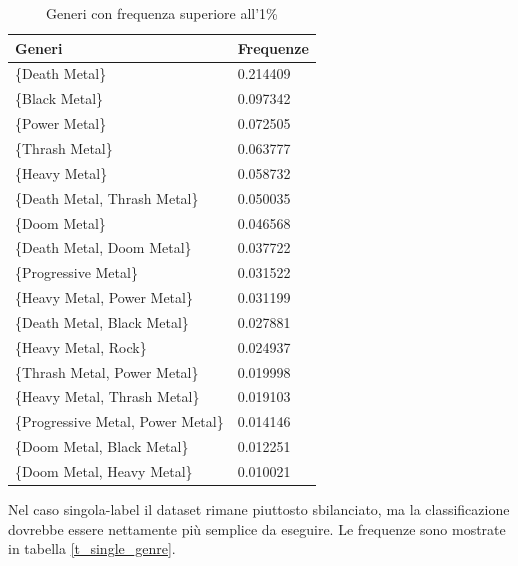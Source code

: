 \documentclass[technote]{IEEEtran}
\begin{document}
\begin{table}[H]
\centering
\caption{Generi con frequenza superiore all'1\%}
\begin{tabular}{|l|l|}
\hline
\textbf{Generi}                    & \textbf{Frequenze} \\ \hline
\{Death Metal\}                    & 0.214409           \\ \hline
\{Black Metal\}                    & 0.097342           \\ \hline
\{Power Metal\}                    & 0.072505           \\ \hline
\{Thrash Metal\}                   & 0.063777           \\ \hline
\{Heavy Metal\}                    & 0.058732           \\ \hline
\{Death Metal, Thrash Metal\}      & 0.050035           \\ \hline
\{Doom Metal\}                     & 0.046568           \\ \hline
\{Death Metal, Doom Metal\}        & 0.037722           \\ \hline
\{Progressive Metal\}              & 0.031522           \\ \hline
\{Heavy Metal, Power Metal\}       & 0.031199           \\ \hline
\{Death Metal, Black Metal\}       & 0.027881           \\ \hline
\{Heavy Metal, Rock\}              & 0.024937           \\ \hline
\{Thrash Metal, Power Metal\}      & 0.019998           \\ \hline
\{Heavy Metal, Thrash Metal\}      & 0.019103           \\ \hline
\{Progressive Metal, Power Metal\} & 0.014146           \\ \hline
\{Doom Metal, Black Metal\}        & 0.012251           \\ \hline
\{Doom Metal, Heavy Metal\}        & 0.010021           \\ \hline
\end{tabular}
\label{t_multi_genres}
\end{table}
Nel caso singola-label il dataset rimane piuttosto sbilanciato,
ma la classificazione dovrebbe essere nettamente più semplice da eseguire.
Le frequenze sono mostrate in tabella \ref{t_single_genre}.
\end{document}
